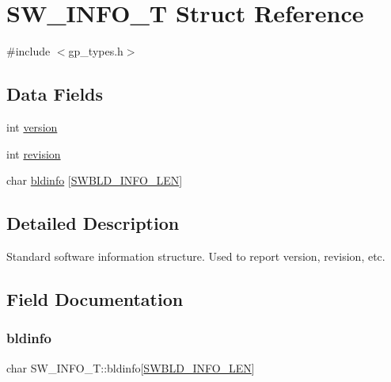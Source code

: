 \hypertarget{structSW__INFO__T}{}\section{S\+W\+\_\+\+I\+N\+F\+O\+\_\+T Struct Reference}
\label{structSW__INFO__T}


{\ttfamily \#include $<$gp\+\_\+types.\+h$>$}

\subsection*{Data Fields}
\begin{DoxyCompactItemize}
\item 
int \mbox{\hyperlink{structSW__INFO__T_a4de1b448e07d278eed52eaabb1a4946b}{version}}
\item 
int \mbox{\hyperlink{structSW__INFO__T_a69e2b84a5a4a96f0941802115b937a3b}{revision}}
\item 
char \mbox{\hyperlink{structSW__INFO__T_afa7c58a1b8415ff83a9066b36e0ab849}{bldinfo}} \mbox{[}\mbox{\hyperlink{gp__types_8h_a002811964d8b04f3e5ae61b5746b4983}{S\+W\+B\+L\+D\+\_\+\+I\+N\+F\+O\+\_\+\+L\+EN}}\mbox{]}
\end{DoxyCompactItemize}


\subsection{Detailed Description}
Standard software information structure. Used to report version, revision, etc. 

\subsection{Field Documentation}
\mbox{\label{structSW__INFO__T_afa7c58a1b8415ff83a9066b36e0ab849}} 
\subsubsection{\texorpdfstring{bldinfo}{bldinfo}}
{\footnotesize\ttfamily char S\+W\+\_\+\+I\+N\+F\+O\+\_\+\+T\+::bldinfo\mbox{[}\mbox{\hyperlink{gp__types_8h_a002811964d8b04f3e5ae61b5746b4983}{S\+W\+B\+L\+D\+\_\+\+I\+N\+F\+O\+\_\+\+L\+EN}}\mbox{]}}

